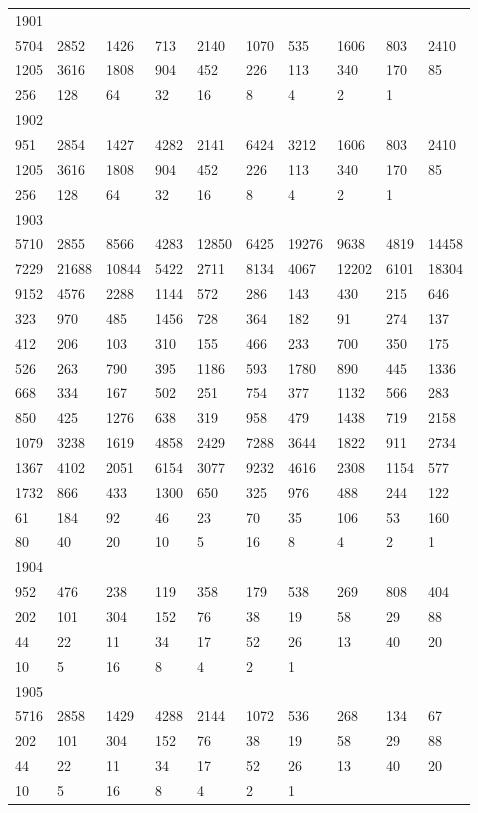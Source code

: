 \begin{longtable}{*{10}{l}}
1901&&&&&&&&&\\
5704& 2852& 1426& 713& 2140& 1070& 535& 1606& 803& 2410\\
1205& 3616& 1808& 904& 452& 226& 113& 340& 170& 85\\
256& 128& 64& 32& 16& 8& 4& 2& 1& \\

1902&&&&&&&&&\\
951& 2854& 1427& 4282& 2141& 6424& 3212& 1606& 803& 2410\\
1205& 3616& 1808& 904& 452& 226& 113& 340& 170& 85\\
256& 128& 64& 32& 16& 8& 4& 2& 1& \\

1903&&&&&&&&&\\
5710& 2855& 8566& 4283& 12850& 6425& 19276& 9638& 4819& 14458\\
7229& 21688& 10844& 5422& 2711& 8134& 4067& 12202& 6101& 18304\\
9152& 4576& 2288& 1144& 572& 286& 143& 430& 215& 646\\
323& 970& 485& 1456& 728& 364& 182& 91& 274& 137\\
412& 206& 103& 310& 155& 466& 233& 700& 350& 175\\
526& 263& 790& 395& 1186& 593& 1780& 890& 445& 1336\\
668& 334& 167& 502& 251& 754& 377& 1132& 566& 283\\
850& 425& 1276& 638& 319& 958& 479& 1438& 719& 2158\\
1079& 3238& 1619& 4858& 2429& 7288& 3644& 1822& 911& 2734\\
1367& 4102& 2051& 6154& 3077& 9232& 4616& 2308& 1154& 577\\
1732& 866& 433& 1300& 650& 325& 976& 488& 244& 122\\
61& 184& 92& 46& 23& 70& 35& 106& 53& 160\\
80& 40& 20& 10& 5& 16& 8& 4& 2& 1\\

1904&&&&&&&&&\\
952& 476& 238& 119& 358& 179& 538& 269& 808& 404\\
202& 101& 304& 152& 76& 38& 19& 58& 29& 88\\
44& 22& 11& 34& 17& 52& 26& 13& 40& 20\\
10& 5& 16& 8& 4& 2& 1& \\

1905&&&&&&&&&\\
5716& 2858& 1429& 4288& 2144& 1072& 536& 268& 134& 67\\
202& 101& 304& 152& 76& 38& 19& 58& 29& 88\\
44& 22& 11& 34& 17& 52& 26& 13& 40& 20\\
10& 5& 16& 8& 4& 2& 1& \\


\end{longtable}
